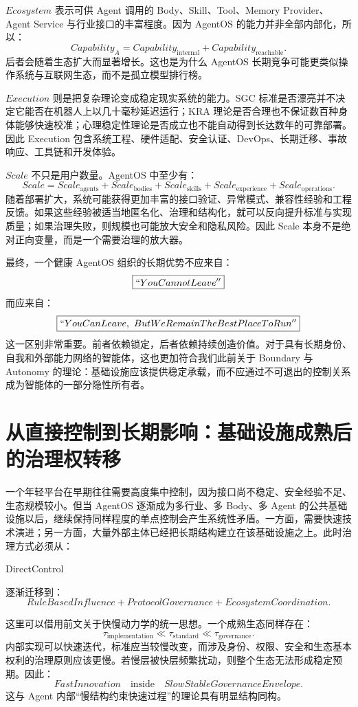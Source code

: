 $Ecosystem$ 表示可供 Agent 调用的 Body、Skill、Tool、Memory Provider、Agent Service 与行业接口的丰富程度。因为 AgentOS 的能力并非全部内部化，所以：
\[
Capability_A
=
Capability_{\mathrm{internal}}
+
Capability_{\mathrm{reachable}}.
\]
后者会随着生态扩大而显著增长。这也是为什么 AgentOS 长期竞争可能更类似操作系统与互联网生态，而不是孤立模型排行榜。

$Execution$ 则是把复杂理论变成稳定现实系统的能力。SGC 标准是否漂亮并不决定它能否在机器人上以几十毫秒延迟运行；KRA 理论是否合理也不保证数百种身体能够快速校准；心理稳定性理论是否成立也不能自动得到长达数年的可靠部署。因此 Execution 包含系统工程、硬件适配、安全认证、DevOps、长期迁移、事故响应、工具链和开发体验。

$Scale$ 不只是用户数量。AgentOS 中至少有：
\[
Scale=
Scale_{\mathrm{agents}}
+
Scale_{\mathrm{bodies}}
+
Scale_{\mathrm{skills}}
+
Scale_{\mathrm{experience}}
+
Scale_{\mathrm{operations}}.
\]
随着部署扩大，系统可能获得更加丰富的接口验证、异常模式、兼容性经验和工程反馈。如果这些经验被适当地匿名化、治理和结构化，就可以反向提升标准与实现质量；如果治理失败，则规模也可能放大安全和隐私风险。因此 Scale 本身不是绝对正向变量，而是一个需要治理的放大器。

最终，一个健康 AgentOS 组织的长期优势不应来自：
\[
\boxed{
``YouCannotLeave''
}
\]
而应来自：
\[
\boxed{
``YouCanLeave,\ ButWeRemainTheBestPlaceToRun''
}
\]
这一区别非常重要。前者依赖锁定，后者依赖持续创造价值。对于具有长期身份、自我和外部能力网络的智能体，这也更加符合我们此前关于 Boundary 与 Autonomy 的理论：基础设施应该提供稳定承载，而不应通过不可退出的控制关系成为智能体的一部分隐性所有者。

\section{从直接控制到长期影响：基础设施成熟后的治理权转移}

一个年轻平台在早期往往需要高度集中控制，因为接口尚不稳定、安全经验不足、生态规模较小。但当 AgentOS 逐渐成为多行业、多 Body、多 Agent 的公共基础设施以后，继续保持同样程度的单点控制会产生系统性矛盾。一方面，需要快速技术演进；另一方面，大量外部主体已经把长期结构建立在该基础设施之上。此时治理方式必须从：
\begin{statementbox}
DirectControl
\end{statementbox}
逐渐迁移到：
\[
\boxed{
RuleBasedInfluence
+
ProtocolGovernance
+
EcosystemCoordination.
}
\]

这里可以借用前文关于快慢动力学的统一思想。一个成熟生态同样存在：
\[
\tau_{\mathrm{implementation}}
\ll
\tau_{\mathrm{standard}}
\ll
\tau_{\mathrm{governance}}.
\]
内部实现可以快速迭代，标准应当较慢改变，而涉及身份、权限、安全和生态基本权利的治理原则应该更慢。若慢层被快层频繁扰动，则整个生态无法形成稳定预期。因此：
\[
\boxed{
FastInnovation
\quad\text{inside}\quad
SlowStableGovernanceEnvelope.
}
\]
这与 Agent 内部``慢结构约束快速过程''的理论具有明显结构同构。

